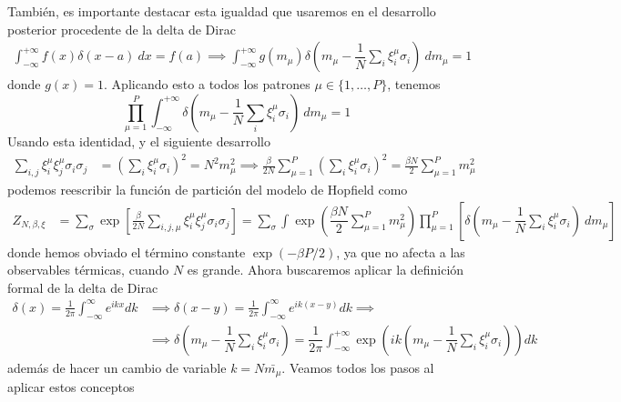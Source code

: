\noindent
También, es importante destacar esta igualdad que usaremos en el desarrollo posterior procedente de la delta de Dirac
\begin{align*}
    \int_{-\infty}^{+\infty} f(x) \delta(x - a) \ dx = f(a) \implies \int_{-\infty}^{+\infty} g(m_{\mu})\delta\left(m_{\mu} - \dfrac{1}{N}\sum_{i} \xi_i^{\mu} \sigma_i\right) \ dm_{\mu} = 1
\end{align*}
donde $g(x)=1$. Aplicando esto a todos los patrones $\mu \in \{1, \ldots, P\}$, tenemos
\begin{equation*}
    \prod_{\mu=1}^{P} \int_{-\infty}^{+\infty} \delta\left(m_{\mu} - \dfrac{1}{N}\sum_{i} \xi_i^{\mu} \sigma_i\right) \ dm_{\mu} = 1
\end{equation*}
Usando esta identidad, y el siguiente desarrollo
\begin{align*}
    \sum_{i,j} \xi_i^\mu \xi_j^\mu \sigma_i \sigma_j &= \left( \sum_{i} \xi_i^\mu \sigma_i \right)^2 = N^2 m_\mu^2\implies \frac{\beta}{2N} \sum_{\mu=1}^P \left( \sum_{i} \xi_i^\mu \sigma_i \right)^2= \frac{\beta N}{2} \sum_{\mu=1}^P m_\mu^2
\end{align*}
podemos reescribir la función de partición del modelo de Hopfield como
\begin{align*}
    Z_{N,\beta,\xi} &= \sum_{\sigma} \exp \left[ \frac{\beta}{2N} \sum_{i,j,\mu} \xi_i^\mu \xi_j^\mu \sigma_i \sigma_j  \right]= \sum_{\sigma} \int \exp\left(\dfrac{\beta N}{2} \sum_{\mu=1}^P m_\mu^2\right) \prod_{\mu=1}^{P} \left[\delta\left(m_{\mu} - \dfrac{1}{N}\sum_{i} \xi_i^{\mu} \sigma_i\right) \ dm_{\mu}\right]
\end{align*}
donde hemos obviado el término constante $\exp\left(-\beta P/2\right)$, ya que no afecta a las observables térmicas, cuando $N$ es grande. Ahora buscaremos aplicar la definición formal de la delta de Dirac
\begin{align*}
    \delta(x) = \frac{1}{2\pi} \int_{-\infty}^{\infty} e^{ikx} dk &\implies \delta(x-y)= \frac{1}{2\pi} \int_{-\infty}^{\infty} e^{ik(x-y)} dk \implies \\
    &\implies \delta\left(m_{\mu}-\dfrac{1}{N}\sum_{i} \xi_i^{\mu} \sigma_i\right)=\dfrac{1}{2\pi}\int_{-\infty}^{+\infty}\exp\left(ik\left(m_{\mu}-\dfrac{1}{N}\sum_{i} \xi_i^{\mu} \sigma_i\right)\right) dk
\end{align*}
además de hacer un cambio de variable $k=N\bar{m_{\mu}}$. Veamos todos los pasos al aplicar estos conceptos
